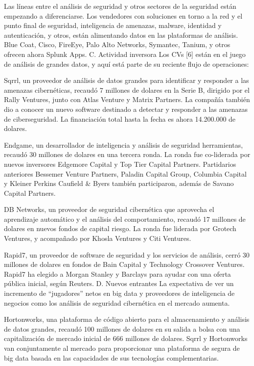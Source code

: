 \documentclass[journal]{IEEEtran}
\begin{document}
Las líneas entre el análisis de seguridad y otros sectores de la seguridad están empezando a diferenciarse. Los vendedores con soluciones en torno a la red y el punto final de seguridad, inteligencia de amenazas, malware, identidad y autenticación, y otros, están alimentando datos en las plataformas de análisis. Blue Coat, Cisco, FireEye, Palo Alto Networks, Symantec, Tanium, y otros ofrecen ahora Splunk Apps.
C. Actividad inversora
Los CVs [6] están en el juego de análisis de grandes datos, y aquí está parte de su reciente flujo de operaciones:

Sqrrl, un proveedor de análisis de datos grandes para identificar y responder a las amenazas cibernéticas, recaudó 7 millones de dolares en la Serie B, dirigido por el Rally Ventures, junto con Atlas Venture y Matrix Partners. La compañía también dio a conocer un nuevo software destinado a detectar y responder a las amenazas de ciberseguridad. La financiación total hasta la fecha es ahora 14.200.000 de dolares.

Endgame, un desarrollador de inteligencia y análisis de seguridad herramientas, recaudó 30 millones de dolares en una tercera ronda. La ronda fue co-liderada por nuevos inversores Edgemore Capital y Top Tier Capital Partners. Partidarios anteriores Bessemer Venture Partners, Paladin Capital Group, Columbia Capital y Kleiner Perkins Caufield \& Byers también participaron, además de Savano Capital Partners.

DB Networks, un proveedor de seguridad cibernética que aprovecha el aprendizaje automático y el análisis del comportamiento, recaudó 17 millones de dolares en nuevos fondos de capital riesgo. La ronda fue liderada por Grotech Ventures, y acompañado por Khosla Ventures y Citi Ventures.

Rapid7, un proveedor de software de seguridad y los servicios de análisis, cerró 30 millones de dolares en fondos de Bain Capital y Technology Crossover Ventures. Rapid7 ha elegido a Morgan Stanley y Barclays para ayudar con una oferta pública inicial, según Reuters.
D. Nuevos entrantes
La expectativa de ver un incremento de “jugadores” netos en big data y proveedores de inteligencia de negocios como los análisis de seguridad cibernética en el mercado aumenta.

Hortonworks, una plataforma de código abierto para el almacenamiento y análisis de datos grandes, recaudó 100 millones de dolares en su salida a bolsa con una capitalización de mercado inicial de 666 millones de dolares. Sqrrl y Hortonworks van conjuntamente al mercado para proporcionar una plataforma de segura de big data basada en las capacidades de sus tecnologías complementarias.
\end{document}
